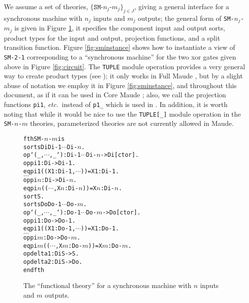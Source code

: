 \documentclass[copyright,creativecommons]{eptcs}
\newcommand{\etc}{\textit{etc.}}
\begin{document}
We assume a set of theories, $\{\texttt{SM-$n_j$-$m_j$}\}_{j \in J}$, giving a
general interface for a synchronous machine with $n_j$ inputs and $m_j$
outputs; the general form of {\tt SM-$n_j$-$m_j$} is given in Figure
\ref{fig:sm}, it specifies the component input and output sorts, product types
for the input and output, projection functions, and a split transition
function. Figure \ref{fig:sminstance} shows how to instantiate a view of {\tt
SM-2-1} corresponding to a ``synchronous machine'' for the two xor gates given
above in Figure \ref{fig:circuit}. The {\tt TUPLE} module operation provides a
very general way to create product types (see \cite[\S
18.3.1]{clavel_2007_01}); it only works in Full Maude \cite[Part
II]{clavel_2007_01}, but by a slight abuse of notation we employ it in Figure
\ref{fig:sminstance}, and throughout this document, as if it can be used in
Core Maude \cite[Part I]{clavel_2007_01}; also, we call the projection
functions {\tt pi1}, \etc\, instead of {\tt p1\_} which is used in \cite[\S
18.3.1]{clavel_2007_01}. In addition, it is worth noting that while it would be
nice to use the {\tt TUPLE[\_]} module operation in the {\tt SM-$n$-$m$}
theories, parameterized theories are not currently allowed in Maude.

\begin{figure}[ht]
\begin{center}
\begin{boxedminipage}{0.55\textwidth}
\begin{small}
\begin{alltt}
fth SM-\(n\)-\(m\) is
  sorts Di Di-1 \(\dotsb\) Di-\(n\) .
  op `(_,\(\dotsb\),_`) : Di-1 \(\dotsb\) Di-\(n\) -> Di [ctor] .
  op pi1 : Di -> Di-1 .
  eq pi1(( X1:Di-1, \(\dotsb\) )) = X1:Di-1 .
  \(\dotso\)
  op pi\(n\) : Di -> Di-\(n\) .
  eq pi\(n\)(( \(\dotsb\), X\(n\):Di-\(n\) )) = X\(n\):Di-\(n\) .
  sort S .
  sorts Do Do-1 \(\dotsb\) Do-\(m\) .
  op `(_,\(\dotsb\),_`) : Do-1 \(\dotsb\) Do-\(m\) -> Do [ctor] .
  op pi1 : Do -> Do-1 .
  eq pi1(( X1:Do-1, \(\dotsb\) )) = X1:Do-1 .
  \(\dotso\)
  op pi\(m\) : Do -> Do-\(m\) .
  eq pi\(m\)(( \(\dotsb\), X\(m\):Do-\(m\) )) = X\(m\):Do-\(m\) .
  op delta1 : Di S -> S .
  op delta2 : Di S -> Do .
endfth
\end{alltt}
\end{small}
\end{boxedminipage}
\end{center}
\caption{The ``functional theory'' for a synchronous machine with $n$ inputs and $m$ outputs.}
\label{fig:sm}
\end{figure}
 
\end{document}
